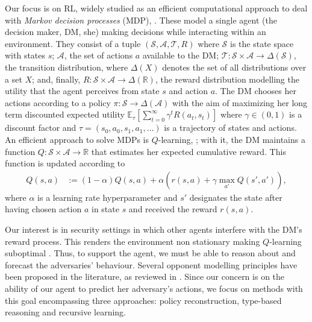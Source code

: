 Our focus is on RL, widely studied as an efficient computational approach to deal with \textit{Markov decision processes} (MDP), \cite{howard:dp}. These model a single agent (the decision maker, DM, she)
making decisions 
while interacting within an environment.  
They consist of a
tuple $\left( \mathcal{S}, \mathcal{A}, \mathcal{T}, R\right)$
where $\mathcal{S}$ is the state space with states $s$; $\mathcal{A}$,   the set of
actions $a$ available to the DM;
$\mathcal{T}: \mathcal{S} \times \mathcal{A} \rightarrow \Delta (\mathcal{S})$, the transition distribution, where $\Delta(X)$ denotes the set of
all distributions over a set $X$;
and, finally, $R : \mathcal{S} \times \mathcal{A}  \rightarrow \Delta(\mathbb{R}) $, the reward distribution modelling the utility that the agent perceives
from state $s$ and action $a$. 
The DM chooses her actions according to a policy $\pi: \mathcal{S} \rightarrow \Delta(\mathcal{A})$ 
with the aim of maximizing 
her long term discounted expected utility
$ 
 \mathbb{E}_{\tau} \left[  \sum_{t=0}^\infty \gamma^t R(a_t, s_t) \right] 
 $ 
where $\gamma \in (0,1)$ is a discount factor and $\tau = (s_0, a_0, s_1, a_1, \ldots)$ is a trajectory of states and actions.
  An efficient approach to solve MDPs is $Q$-learning, \cite{sutton2012reinforcement}; with it, the DM maintains a
 function
$Q : \mathcal{S} \times \mathcal{A} \rightarrow \mathbb{R}$ that estimates
her expected cumulative reward. This function is updated according to
\begin{align}\label{eq:ql}
Q(s,a) &:= (1 - \alpha) Q(s, a)  +  \alpha \left(r(s,a) + \gamma\max_{a'} Q(s', a') \right),
\end{align}
where $\alpha$ is a learning rate hyperparameter
and $s'$ designates the state %
after having chosen action $a$ in state $s$ and received the reward $r(s,a)$.

Our interest is in security settings in which other  agents
interfere with the DM's reward process. This renders the environment
non stationary making  $Q$-learning suboptimal \cite{marl_over}. 
Thus, to support the agent,
we must be able to reason about and forecast the adversaries' behaviour.
Several opponent modelling principles have been proposed in the  literature,
as reviewed in \cite{Albrecht2018AutonomousAM}. 
Since our concern is on the ability of our agent to predict 
her adversary's actions, we focus on methods
with this goal encompassing three approaches: policy reconstruction, type-based reasoning and recursive learning.


